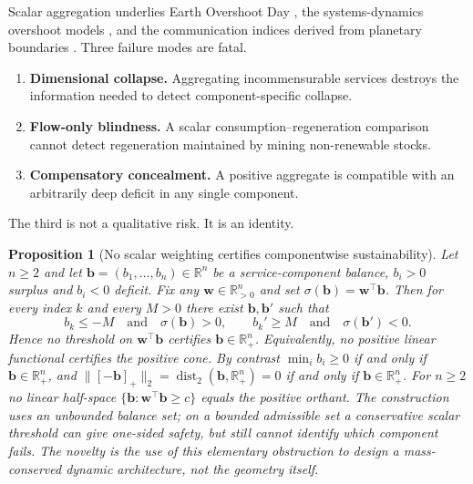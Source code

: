 \documentclass[11pt]{article}
\newtheorem{proposition}{Proposition}
\theoremstyle{definition}
\begin{document}
Scalar aggregation underlies Earth Overshoot Day \cite{lin2018,wackernagel2019,blomqvist2013}, the systems-dynamics overshoot models \cite{meadows1972}, and the communication indices derived from planetary boundaries \cite{rockstrom2009,steffen2015,richardson2023}. Three failure modes are fatal.

\begin{enumerate}
\item \textbf{Dimensional collapse.} Aggregating incommensurable services destroys the information needed to detect component-specific collapse.
\item \textbf{Flow-only blindness.} A scalar consumption--regeneration comparison cannot detect regeneration maintained by mining non-renewable stocks.
\item \textbf{Compensatory concealment.} A positive aggregate is compatible with an arbitrarily deep deficit in any single component.
\end{enumerate}

The third is not a qualitative risk. It is an identity.

\begin{proposition}[No scalar weighting certifies componentwise sustainability]
\label{prop:no-scalar}
Let $n\ge 2$ and let $\mathbf b=(b_1,\dots,b_n)\in\mathbb R^n$ be a service-component balance, $b_i>0$ surplus and $b_i<0$ deficit. Fix any $\mathbf w\in\mathbb R^n_{>0}$ and set $\sigma(\mathbf b)=\mathbf w^\top\mathbf b$. Then for every index $k$ and every $M>0$ there exist $\mathbf b,\mathbf b'$ such that
\begin{equation}
b_k\le -M\quad\text{and}\quad\sigma(\mathbf b)>0,
\qquad
b_k'\ge M\quad\text{and}\quad\sigma(\mathbf b')<0.
\end{equation}
Hence no threshold on $\mathbf w^\top\mathbf b$ certifies $\mathbf b\in\mathbb R^n_+$. Equivalently, no positive linear functional certifies the positive cone. By contrast $\min_i b_i\ge 0$ if and only if $\mathbf b\in\mathbb R^n_+$, and $\|[-\mathbf b]_+\|_2=\operatorname{dist}_2(\mathbf b,\mathbb R^n_+)=0$ if and only if $\mathbf b\in\mathbb R^n_+$. For $n\ge 2$ no linear half-space $\{\mathbf b:\mathbf w^\top\mathbf b\ge c\}$ equals the positive orthant. The construction uses an unbounded balance set; on a bounded admissible set a conservative scalar threshold can give one-sided safety, but still cannot identify which component fails. The novelty is the use of this elementary obstruction to design a mass-conserved dynamic architecture, not the geometry itself.
\end{proposition}
\end{document}
